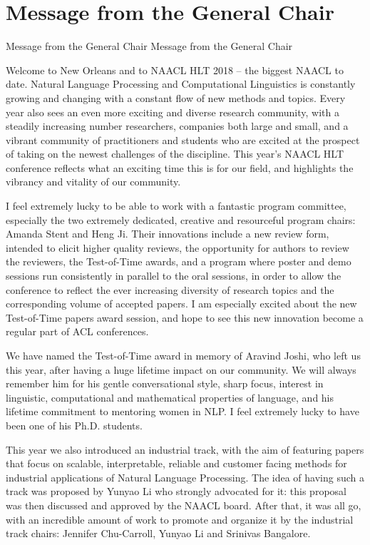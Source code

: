 \vspace{-4em}

\section{Message from the General Chair}%
\setheaders%
    {Message from the General Chair}%
    {Message from the General Chair}
\thispagestyle{emptyheader}


Welcome to New Orleans and to NAACL HLT 2018 – the biggest NAACL to
date.  Natural Language Processing and Computational Linguistics is
constantly growing and changing with a constant flow of new methods
and topics. Every year also sees an even more exciting and diverse
research community, with a steadily increasing number researchers,
companies both large and small, and a vibrant community of
practitioners and students who are excited at the prospect of taking
on the newest challenges of the discipline.  This year’s NAACL HLT
conference reflects what an exciting time this is for our field, and
highlights the vibrancy and vitality of our community.

I feel extremely lucky to be able to work with a fantastic program
committee, especially the two extremely dedicated, creative and
resourceful program chairs: Amanda Stent and Heng Ji. Their
innovations include a new review form, intended to elicit higher
quality reviews, the opportunity for authors to review the reviewers,
the Test-of-Time awards, and a program where poster and demo sessions
run consistently in parallel to the oral sessions, in order to allow
the conference to reflect the ever increasing diversity of research
topics and the corresponding volume of accepted papers.  I am
especially excited about the new Test-of-Time papers award session,
and hope to see this new innovation become a regular part of ACL
conferences.

We have	named the Test-of-Time award in memory of Aravind Joshi, who
left us this year, after having a huge lifetime impact on our
community. We will always remember him for his gentle conversational
style, sharp focus, interest in linguistic, computational and
mathematical properties of language, and his lifetime commitment to
mentoring women in NLP.	I feel extremely lucky to have been one	of his
Ph.D. students.

This year we also introduced an industrial track, with the aim of
featuring papers that focus on scalable, interpretable, reliable and
customer facing methods for industrial applications of Natural
Language Processing. The idea of having such a track was proposed by
Yunyao Li who strongly advocated for it: this proposal was then
discussed and approved by the NAACL board. After that, it was all go,
with an incredible amount of work to promote and organize it by the
industrial track chairs: Jennifer Chu-Carroll, Yunyao Li and Srinivas
Bangalore.

